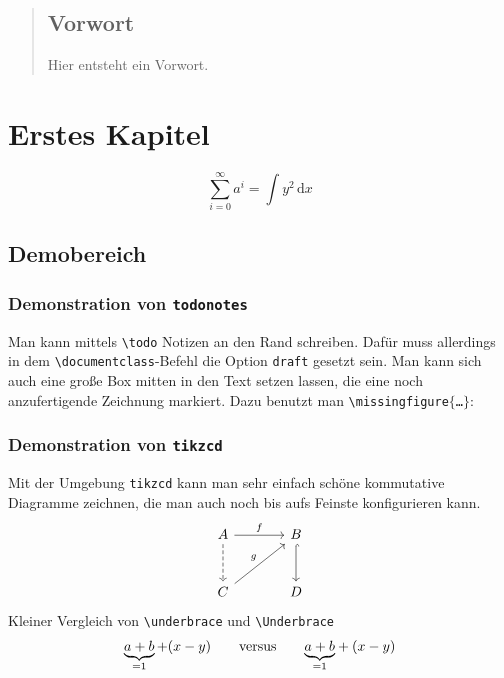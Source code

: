 \begin{abstract}
\section*{Vorwort}
Hier entsteht ein Vorwort.
\end{abstract}
\tableofcontents
\cleardoubleoddemptypage
{}
\setcounter{page}{1}

\chapter{Erstes Kapitel} %
\label{cha:erstes_kapitel}
\[
	\sum_{i=0}^{\infty} a^i = \int y^2 \,\mathrm{d} x 
\]

\section{Demobereich} %
\subsection{Demonstration von \texttt{todonotes}} 
Man kann mittels \texttt{\textbackslash{}todo} Notizen an den Rand schreiben. Dafür muss allerdings in dem \texttt{\textbackslash{}documentclass}-Befehl die Option \texttt{draft} gesetzt sein. Man kann sich auch eine große Box mitten in den Text setzen lassen, die eine noch anzufertigende Zeichnung markiert. Dazu benutzt man \texttt{\textbackslash{}missingfigure$\{$\ldots$\}$}:

\subsection{Demonstration von \texttt{tikzcd}}
Mit der Umgebung \texttt{tikzcd} kann man sehr einfach schöne kommutative Diagramme zeichnen, die man auch noch bis aufs Feinste konfigurieren kann.
\[
	\begin{tikzcd}[sep=large]
		A \rar["f"] \dar[dashed] & B \dar[hook] \\
		C \urar["g"] & D
	\end{tikzcd}
\]
Kleiner Vergleich von \texttt{\textbackslash{}underbrace} und \texttt{\textbackslash{}Underbrace}
\[
	\underbrace{a+b}_{=1} + (x-y) \qquad \text{versus} \qquad {\underbrace{a+b}_{=1}} + (x-y)
\]

